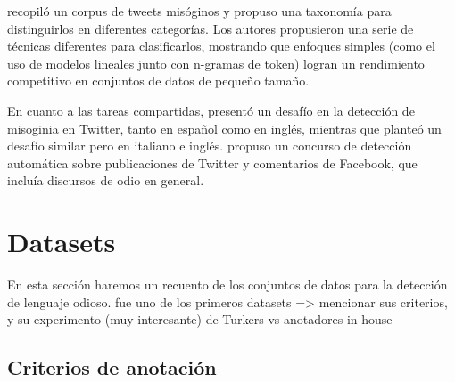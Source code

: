 \citet{anzovino2018automatic} recopiló un corpus de tweets misóginos y propuso una taxonomía para distinguirlos en diferentes categorías. Los autores propusieron una serie de técnicas diferentes para clasificarlos, mostrando que enfoques simples (como el uso de modelos lineales junto con n-gramas de token) logran un rendimiento competitivo en conjuntos de datos de pequeño tamaño.

En cuanto a las tareas compartidas, \citet{fersini2018overview} presentó un desafío en la detección de misoginia en Twitter, tanto en español como en inglés, mientras que \citet{fersini2018evalitaoverview} planteó un desafío similar pero en italiano e inglés. \citet{bosco2018overview} propuso un concurso de detección automática sobre publicaciones de Twitter y comentarios de Facebook, que incluía discursos de odio en general.


\section{Datasets}

En esta sección haremos un recuento de los conjuntos de datos para la detección de lenguaje odioso.
\citet{nobata2016abusive} fue uno de los primeros datasets => mencionar sus criterios, y su experimento (muy interesante) de Turkers vs anotadores in-house



\citet{gao2018detecting}

\subsection{Criterios de anotación}

